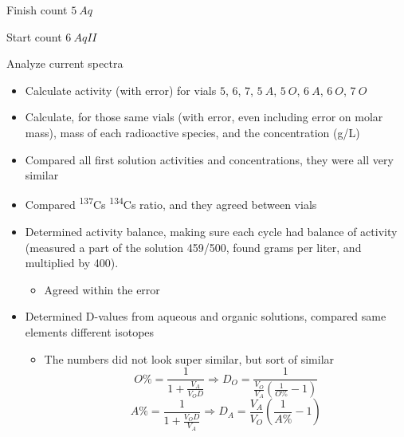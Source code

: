 \documentclass[idxtotoc,hyperref,openany,oneside]{labbook} %
\newcommand{\cmark}{\ding{51}}%
\newcommand{\done}{\rlap{$\square$}{\raisebox{2pt}{\large\hspace{1pt}\cmark}}%
  \hspace{-2.5pt}}
\newcommand{\tss}{\textsuperscript}
\begin{document}
 




\begin{todolist}
\item[\done]{Finish count $\boxed{5\ Aq}$}
\item[\done]{Start count $\boxed{6\ AqII}$}
\item[\done]{Analyze current spectra}
  \begin{itemize}
  \item{Calculate activity (with error) for
    vials $\boxed{5}$, $\boxed{6}$, $\boxed{7}$,
    $\boxed{5\ A}$, $\boxed{5\ O}$, $\boxed{6\ A}$,
    $\boxed{6\ O}$, $\boxed{7\ O}$}
  \item{Calculate, for those same vials (with error,
    even including error on molar mass), mass of each
    radioactive species, and the concentration (g/L)}
  \item{Compared all first solution activities and concentrations,
    they were all very similar}
  \item{Compared \tss{137}Cs \tss{134}Cs ratio, and they agreed between
    vials}
  \item{Determined activity balance, making sure each
    cycle had balance of activity (measured a part of the solution
    459/500, found grams per liter, and multiplied by 400).}
    \begin{itemize}
    \item{Agreed within the error}
    \end{itemize}
  \item{Determined D-values from aqueous and organic solutions,
    compared same elements different isotopes}
    \begin{itemize}
    \item{The numbers did not look super similar,
      but sort of similar}
      \begin{equation*}
        O\%=\frac{1}{1+\frac{V_{A}}{V_{O}D}}
        \Rightarrow D_O=\frac{1}{\frac{V_O}{V_A}(\frac{1}{O\%}-1)}
      \end{equation*}
      \begin{equation*}
        A\%=\frac{1}{1+\frac{V_OD}{V_A}}\Rightarrow
        D_A=\frac{V_A}{V_O}(\frac{1}{A\%}-1)
      \end{equation*}

\end{itemize}
\end{itemize}
\end{todolist}
\end{document}

